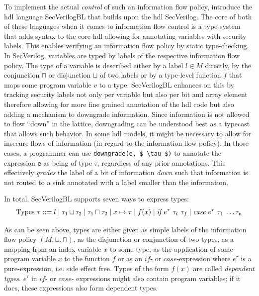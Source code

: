 To implement the actual \textit{control} of such an information flow policy, \citeauthor{Ferraiuolo17} introduce the \gls{hdl} language SecVerilogBL that builds upon the \gls{hdl} SecVerilog.
The core of both of these languages when it comes to information flow control is a type-system that adds syntax to the core \gls{hdl} allowing for annotating variables with security labels.
This enables verifying an information flow policy by static type-checking.
In SecVerilog, variables are typed by labels of the respective information flow policy.
The type of a variable is described either by a label $ l \in M $ directly, by the conjunction $ \sqcap $ or disjunction $ \sqcup $ of two labels or by a type-level function $ f $ that maps some program variable $ v $ to a type.
SecVerilogBL enhances on this by tracking security labels not only per variable but also per bit and array element therefore allowing for more fine grained annotation of the \gls{hdl} code but also adding a mechanism to downgrade information.
Since information is not allowed to flow \enquote{down} in the lattice, downgrading can be understood best as a typecast that allows such behavior.
In some \gls{hdl} models, it might be necessary to allow for insecure flows of information (in regard to the information flow policy).
In those cases, a programmer can use \lstinline[mathescape]{downgrade(e, $ \tau $)} to annotate the expression \lstinline{e} as being of type $ \tau $, regardless of any prior annotations.
This effectively \textit{grades} the label of a bit of information \textit{down} such that information is not routed to a sink annotated with a label smaller than the information.

In total, SecVerilogBL supports seven ways to express types:
\begin{align*}
    \text{Types } \tau ::= l \mid \tau_1 \sqcup \tau_2 \mid \tau_1 \sqcap \tau_2 \mid x \mapsto \tau \mid f(x) \mid \textit{if $ e^\tau $ $ \tau_t $ $ \tau_f $} \mid \textit{case $ e^\tau $ $ \tau_1 $ \dots $ \tau_n $}
\end{align*}

As can be seen above, types are either given as simple labels of the information flow policy $ (M, \sqcup, \sqcap) $, as the disjunction or conjunction of two types, as a mapping from an index variable $ x $ to some type, as the application of some program variable $ x $ to the function $ f $ or as an $ \textit{if} $- or $ \textit{case} $-expression where $ e^\tau $ is a pure-expression, i.e. side effect free.
Types of the form $ f(x) $ are called \textit{dependent types}.
$ e^\tau $ in $ \textit{if} $- or $ \textit{case} $- expressions might also contain program variables; if it does, these expressions also form dependent types.

